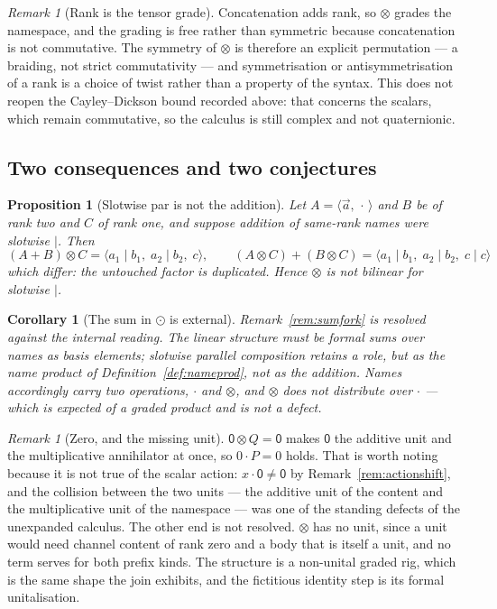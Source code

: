 \documentclass[11pt]{article}
\newtheorem{proposition}[theorem]{Proposition}
\newtheorem{corollary}[theorem]{Corollary}
\theoremstyle{definition}
\theoremstyle{remark}
\newtheorem{remark}[theorem]{Remark}
\newcommand{\pzero}{\mathsf{0}}
\newcommand{\dip}[2]{\ensuremath{\langle #1 , #2 \rangle}}
\begin{document}
\begin{remark}[Rank is the tensor grade]
Concatenation adds rank, so $\otimes$ grades the namespace, and the grading is
free rather than symmetric because concatenation is not commutative. The
symmetry of $\otimes$ is therefore an explicit permutation --- a braiding, not
strict commutativity --- and symmetrisation or antisymmetrisation of a rank is a
choice of twist rather than a property of the syntax. This does not reopen the
Cayley--Dickson bound recorded above: that concerns the scalars, which remain
commutative, so the calculus is still complex and not quaternionic.
\end{remark}

\subsection{Two consequences and two conjectures}

\begin{proposition}[Slotwise par is not the addition]
\label{prop:notbilinear}
Let $A = \dip{\vec{a}}{\,\cdot\,}$ and $B$ be of rank two and $C$ of rank one,
and suppose addition of same-rank names were slotwise $\mid$. Then
\[
  (A + B) \otimes C = \langle a_1 \mid b_1,\; a_2 \mid b_2,\; c \rangle,
  \qquad
  (A \otimes C) + (B \otimes C) = \langle a_1 \mid b_1,\; a_2 \mid b_2,\; c \mid c \rangle
\]
which differ: the untouched factor is duplicated. Hence $\otimes$ is not
bilinear for slotwise $\mid$.
\end{proposition}

\begin{corollary}[The sum in $\odot$ is external]
\label{cor:external}
Remark~\ref{rem:sumfork} is resolved against the internal reading. The linear
structure must be formal sums over names as basis elements; slotwise parallel
composition retains a role, but as the name \emph{product} of
Definition~\ref{def:nameprod}, not as the addition. Names accordingly carry two
operations, $\cdot$ and $\otimes$, and $\otimes$ does not distribute over
$\cdot$ --- which is expected of a graded product and is not a defect.
\end{corollary}

\begin{remark}[Zero, and the missing unit]
\label{rem:zerounit}
$\pzero \otimes Q = \pzero$ makes $\pzero$ the additive unit and the
multiplicative annihilator at once, so $0 \cdot P = 0$ holds. That is worth
noting because it is not true of the scalar action: $x \cdot \pzero \neq \pzero$
by Remark~\ref{rem:actionshift}, and the collision between the two units --- the
additive unit of the content and the multiplicative unit of the namespace ---
was one of the standing defects of the unexpanded calculus. The other end is not
resolved.
$\otimes$ has no unit, since a unit would need channel content of rank zero and
a body that is itself a unit, and no term serves for both prefix kinds. The
structure is a non-unital graded rig, which is the same shape the join exhibits,
and the fictitious identity step is its formal unitalisation.
\end{remark}
\end{document}
